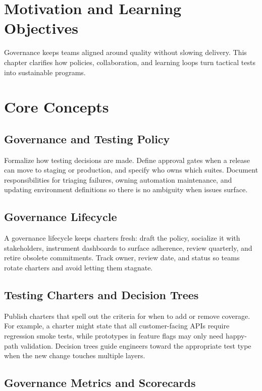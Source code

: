 \section{Motivation and Learning Objectives}

Governance keeps teams aligned around quality without slowing delivery. This chapter clarifies how policies, collaboration, and learning loops turn tactical tests into sustainable programs.

\section{Core Concepts}

\subsection{Governance and Testing Policy}

Formalize how testing decisions are made. Define approval gates when a release can move to staging or production, and specify who owns which suites. Document responsibilities for triaging failures, owning automation maintenance, and updating environment definitions so there is no ambiguity when issues surface.

\subsection{Governance Lifecycle}

A governance lifecycle keeps charters fresh: draft the policy, socialize it with stakeholders, instrument dashboards to surface adherence, review quarterly, and retire obsolete commitments. Track owner, review date, and status so teams rotate charters and avoid letting them stagnate.

\subsection{Testing Charters and Decision Trees}

Publish charters that spell out the criteria for when to add or remove coverage. For example, a charter might state that all customer-facing APIs require regression smoke tests, while prototypes in feature flags may only need happy-path validation. Decision trees guide engineers toward the appropriate test type when the new change touches multiple layers.

\subsection{Governance Metrics and Scorecards}


